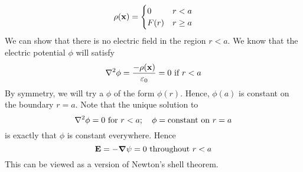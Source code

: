 \[ \rho(\vb x) = \begin{cases}
		0    & r < a    \\
		F(r) & r \geq a
	\end{cases} \]
We can show that there is no electric field in the region $r < a$. We know that the electric potential $\phi$ will satisfy
\[ \laplacian{\phi} = \frac{-\rho(\vb x)}{\varepsilon_0} = 0 \text{ if } r<a \]
By symmetry, we will try a $\phi$ of the form $\phi(r)$. Hence, $\phi(a)$ is constant on the boundary $r=a$. Note that the unique solution to
\[ \laplacian{\phi} = 0 \text{ for } r<a;\quad \phi = \text{constant on } r = a \]
is exactly that $\phi$ is constant everywhere. Hence
\[ \vb E = -\grad{\psi} = 0 \text{ throughout } r<a \]
This can be viewed as a version of Newton's shell theorem.
